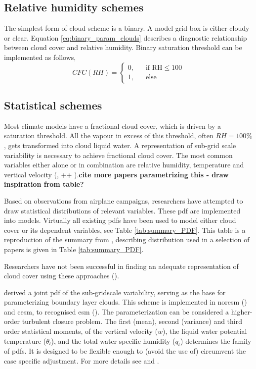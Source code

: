 \subsection{Relative humidity schemes}
The simplest form of cloud scheme is a binary. A model grid box is either cloudy or clear. Equation \eqref{eq:binary_param_clouds} describes a diagnostic relationship between cloud cover and relative humidity. Binary saturation threshold can be implemented as follows,
\begin{equation} \label{eq:binary_param_clouds}
    CFC\left(RH\right) = 
     \begin{cases}
       \text{0,} &\quad\text{if RH}\le100\\
       \text{1,} &\quad\text{else}
     \end{cases}
\end{equation}

\subsection{Statistical schemes}
Most climate models have a fractional cloud cover, which is driven by a saturation threshold. All the vapour in excess of this threshold, often $RH=100\%$, gets transformed into cloud liquid water. A representation of sub-grid scale variability is necessary to achieve fractional cloud cover. The most common variables either alone or in combination are relative humidity, temperature and vertical velocity (\cite{Golaz2002_part1}, ++ ).\textbf{cite more papers parametrizing this - draw inspiration from table?}  

Based on observations from airplane campaigns, researchers have attempted to draw statistical distributions of relevant variables. These \acrfull{pdf} are implemented into models. Virtually all existing \acrshort{pdf}s have been used to model either cloud cover or its dependent variables, see Table \ref{tab:summary_PDF}. This table is a reproduction of the summary from , describing distribution used in a selection of papers is given in Table \ref{tab:summary_PDF}.

Researchers have not been successful in finding an adequate representation of cloud cover using these approaches (\cite{Tompkins2009CloudParametrization}). 

\cite{Golaz2002_part1} derived a joint \acrshort{pdf} of the sub-gridscale variability, serving as the base for parameterizing boundary layer clouds. This scheme is implemented in \acrfull{noresm} (\cite{SelandNORESM}) and \acrfull{cesm}, to recognised \acrshort{esm} (\cite{DanabasogluCESM}).
The parameterization can be considered a higher-order turbulent closure problem. The first (mean), second (variance) and third order statistical moments, of the vertical velocity ($w$), the liquid water potential temperature ($\theta_l$), and the total water specific humidity ($q_t$) determines the family of \acrshort{pdf}s. It is designed to be flexible enough to (avoid the use of) circumvent the case specific adjustment. For more details see \cite{Golaz2002_part1} and \cite{Golaz2002_part2}.

